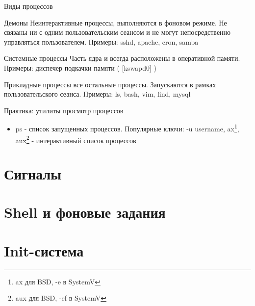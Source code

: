 \begin{frame}{Виды процессов}
  \begin{block}{Демоны}
    Неинтерактивные процессы, выполняются в фоновом режиме. Не связаны ни с одним пользовательским сеансом и не могут непосредственно управляться пользователем. \newline
    Примеры: \alert{sshd}, \alert{apache}, \alert{cron}, \alert{samba}
  \end{block} \pause

  \begin{block}{Системные процессы}
    Часть ядра и всегда расположены в оперативной памяти. \newline
    Примеры: диспечер подкачки памяти ( \alert{[kswapd0]} )
  \end{block} \pause

  \begin{block}{Прикладные процессы}
    все остальные процессы. Запускаются в рамках пользовательского сеанса. \newline
    Примеры: \alert{ls}, \alert{bash}, \alert{vim}, \alert{find}, \alert{mysql}

  \end{block}

\end{frame}

\begin{frame}{Практика: утилиты просмотр процессов}
    \begin{itemize}
      \item \alert{ps} - список запущенных процессов.\newline
	Популярные ключи: \alert{-u username}, 
	\alert{ax}\footnote{ \alert{ax} для BSD, \alert{-e} в SystemV}, 
	\alert{aux}\footnote{ \alert{aux} для BSD, \alert{-ef} в SystemV}
 - интерактивный список процессов

    \end{itemize}
\end{frame}

\section{Сигналы}

\section{Shell и фоновые задания}

\section{Init-система}


